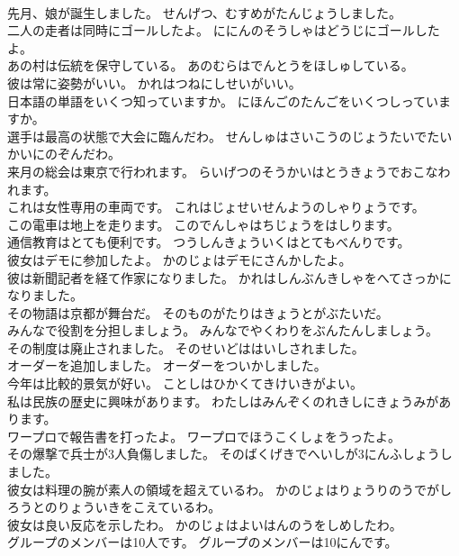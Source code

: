 \documentclass[8pt]{extreport}
\begin{document}
\begin{CJK}{UTF8}{min}
\\	先月、娘が誕生しました。	せんげつ、むすめがたんじょうしました。 
\\	二人の走者は同時にゴールしたよ。	ににんのそうしゃはどうじにゴールしたよ。 
\\	あの村は伝統を保守している。	あのむらはでんとうをほしゅしている。 
\\	彼は常に姿勢がいい。	かれはつねにしせいがいい。 
\\	日本語の単語をいくつ知っていますか。	にほんごのたんごをいくつしっていますか。 
\\	選手は最高の状態で大会に臨んだわ。	せんしゅはさいこうのじょうたいでたいかいにのぞんだわ。 
\\	来月の総会は東京で行われます。	らいげつのそうかいはとうきょうでおこなわれます。 
\\	これは女性専用の車両です。	これはじょせいせんようのしゃりょうです。 
\\	この電車は地上を走ります。	このでんしゃはちじょうをはしります。 
\\	通信教育はとても便利です。	つうしんきょういくはとてもべんりです。 
\\	彼女はデモに参加したよ。	かのじょはデモにさんかしたよ。 
\\	彼は新聞記者を経て作家になりました。	かれはしんぶんきしゃをへてさっかになりました。 
\\	その物語は京都が舞台だ。	そのものがたりはきょうとがぶたいだ。 
\\	みんなで役割を分担しましょう。	みんなでやくわりをぶんたんしましょう。 
\\	その制度は廃止されました。	そのせいどははいしされました。 
\\	オーダーを追加しました。	オーダーをついかしました。 
\\	今年は比較的景気が好い。	ことしはひかくてきけいきがよい。 
\\	私は民族の歴史に興味があります。	わたしはみんぞくのれきしにきょうみがあります。 
\\	ワープロで報告書を打ったよ。	ワープロでほうこくしょをうったよ。 
\\	その爆撃で兵士が3人負傷しました。	そのばくげきでへいしが3にんふしょうしました。 
\\	彼女は料理の腕が素人の領域を超えているわ。	かのじょはりょうりのうでがしろうとのりょういきをこえているわ。 
\\	彼女は良い反応を示したわ。	かのじょはよいはんのうをしめしたわ。 
\\	グループのメンバーは10人です。	グループのメンバーは10にんです。 

\end{CJK}
\end{document}
